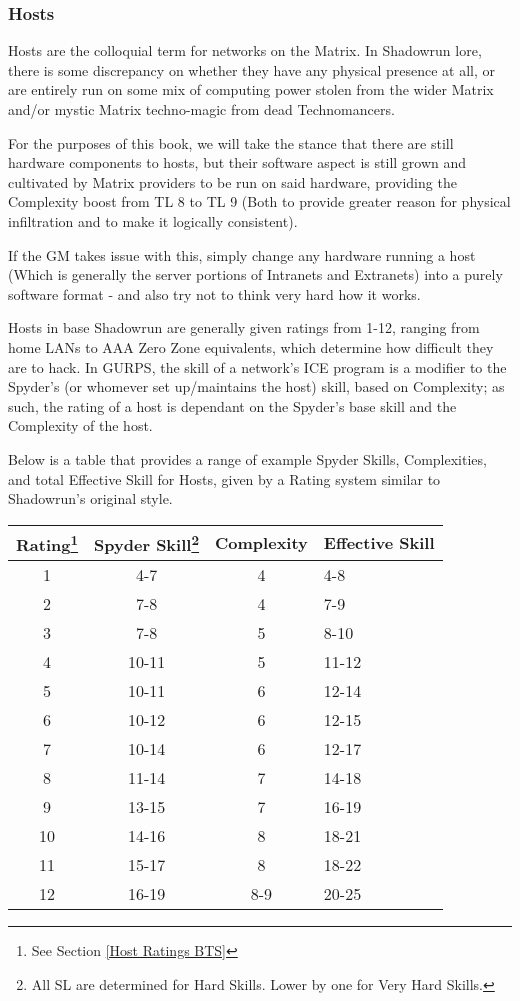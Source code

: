 \begin{multicols}{3}
	\subsubsection{Hosts}
	
	Hosts are the colloquial term for networks on the Matrix. In Shadowrun lore, there is some discrepancy on whether they have any physical presence at all, or are entirely run on some mix of computing power stolen from the wider Matrix and/or mystic Matrix techno-magic from dead Technomancers. 
	
	For the purposes of this book, we will take the stance that there are still hardware components to hosts, but their software aspect is still grown and cultivated by Matrix providers to be run on said hardware, providing the Complexity boost from TL 8 to TL 9 (Both to provide greater reason for physical infiltration and to make it logically consistent). 
	
	If the GM takes issue with this, simply change any hardware running a host (Which is generally the server portions of Intranets and Extranets) into a purely software format - and also try not to think very hard how it works.
	
	Hosts in base Shadowrun are generally given ratings from 1-12, ranging from home LANs to AAA Zero Zone equivalents, which determine how difficult they are to hack. In GURPS, the skill of a network's ICE program is a modifier to the Spyder's (or whomever set up/maintains the host) skill, based on Complexity; as such, the rating of a host is dependant on the Spyder's base skill and the Complexity of the host.
	
	Below is a table that provides a range of example Spyder Skills, Complexities, and total Effective Skill for Hosts, given by a Rating system similar to Shadowrun's original style.
	
	\begin{center}
		\begin{tabularx}{0.47\textwidth}{|c|c|c|X|}
			\hline
			Rating\footnote{See Section \ref{Host Ratings BTS}} & Spyder Skill\footnote{All SL are determined for Hard Skills. Lower by one for Very Hard Skills. } & Complexity & Effective Skill \\
			\hline
			\hline
			1 & 4-7 & 4 & 4-8 \\
			2 & 7-8 & 4 & 7-9 \\
			3 & 7-8 & 5 & 8-10 \\
			4 & 10-11 & 5 & 11-12 \\
			5 & 10-11 & 6 & 12-14 \\
			6 & 10-12 & 6 & 12-15 \\
			7 & 10-14 & 6 & 12-17 \\
			8 & 11-14 & 7 & 14-18 \\
			9 & 13-15 & 7 & 16-19 \\
			10 & 14-16 & 8 & 18-21 \\
			11 & 15-17 & 8 & 18-22 \\
			12 & 16-19 & 8-9 & 20-25\\
			\hline
		\end{tabularx}
	\end{center}
	

\end{multicols}
